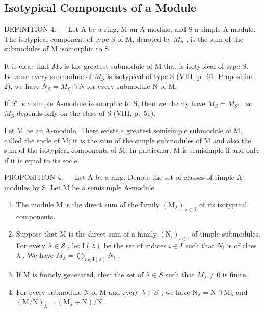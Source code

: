 \subsection{Isotypical Components of a Module}

DEFINITION 4. --- Let A be a ring, M an A-module, and S a simple A-module. The isotypical component of type S of M, denoted by \(M_{S}\) , is the sum of the submodules of M isomorphic to S.

It is clear that \(M_{S}\) is the greatest submodule of M that is isotypical of type S. Because every submodule of \(M_{S}\) is isotypical of type S (VIII, p.~61, Proposition 2), we have \(N_{S} = M_{S} \cap N\) for every submodule N of M.

If \(S'\) is a simple A-module isomorphic to S, then we clearly have \(M_{S} = M_{S'}\) , so \(M_{S}\) depends only on the class of S (VIII, p.~51).

Let M be an A-module. There exists a greatest semisimple submodule of M, called the socle of M; it is the sum of the simple submodules of M and also the sum of the isotypical components of M. In particular, M is semisimple if and only if it is equal to its socle.

PROPOSITION 4. --- Let A be a ring. Denote the set of classes of simple A-modules by S. Let M be a semisimple A-module.

\begin{enumerate}
\def\labelenumi{\alph{enumi})}
\item
  The module M is the direct sum of the family \((\mathrm{M}_{\lambda})_{\lambda\in\mathcal{S}}\) of its isotypical components.
\item
  Suppose that M is the direct sum of a family \((\mathrm{N}_{i})_{i\in\mathrm{I}}\) of simple submodules. For every \(\lambda\in\mathscr{S}\) , let \(\mathrm{I}(\lambda)\) be the set of indices \(i\in I\) such that \(N_{i}\) is of class \(\lambda\) . We have \(M_{\lambda}=\bigoplus_{i\in\mathrm{I}(\lambda)}N_{i}\) .
\item
  If M is finitely generated, then the set of \(\lambda\in S\) such that \(M_{\lambda}\neq0\) is finite.
\item
  For every submodule \(\mathrm{N}\) of \(\mathrm{M}\) and every \(\lambda \in \mathcal{S}\) , we have \(\mathrm{N}_{\lambda} = \mathrm{N} \cap \mathrm{M}_{\lambda}\) and \((\mathrm{M} / \mathrm{N})_{\lambda} = (\mathrm{M}_{\lambda} + \mathrm{N}) / \mathrm{N}\) .
\end{enumerate}

